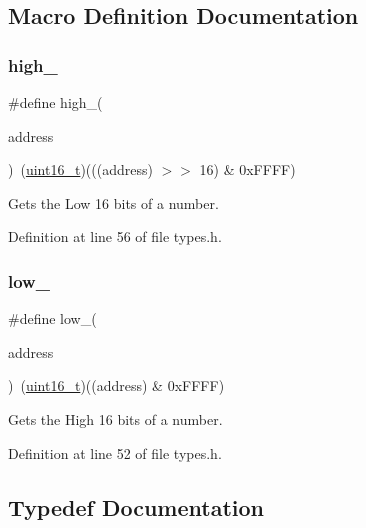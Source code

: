 \subsection{Macro Definition Documentation}
\mbox{\label{a00032_a0a63db19c3e2153ed419aeccf4e33c92_a0a63db19c3e2153ed419aeccf4e33c92}} 
\subsubsection{\texorpdfstring{high\+\_}{high\_16}}
{\footnotesize\ttfamily \#define high\+\_(\begin{DoxyParamCaption}\item[{}]{address }\end{DoxyParamCaption})~(\hyperlink{a00032_a273cf69d639a59973b6019625df33e30_a273cf69d639a59973b6019625df33e30}{uint16\+\_\+t})(((address) $>$$>$ 16) \& 0x\+F\+F\+F\+F)}



Gets the Low 16 bits of a number. 



Definition at line 56 of file types.\+h.

\mbox{\label{a00032_aded7ad58a4bedfffea10d5ae9c0c817e_aded7ad58a4bedfffea10d5ae9c0c817e}} 
\subsubsection{\texorpdfstring{low\+\_}{low\_16}}
{\footnotesize\ttfamily \#define low\+\_(\begin{DoxyParamCaption}\item[{}]{address }\end{DoxyParamCaption})~(\hyperlink{a00032_a273cf69d639a59973b6019625df33e30_a273cf69d639a59973b6019625df33e30}{uint16\+\_\+t})((address) \& 0x\+F\+F\+F\+F)}



Gets the High 16 bits of a number. 



Definition at line 52 of file types.\+h.



\subsection{Typedef Documentation}
\mbox{\label{a00032_aa0015d6dd7c46f7b7a2ff7b5bf407f5c_aa0015d6dd7c46f7b7a2ff7b5bf407f5c}} 
